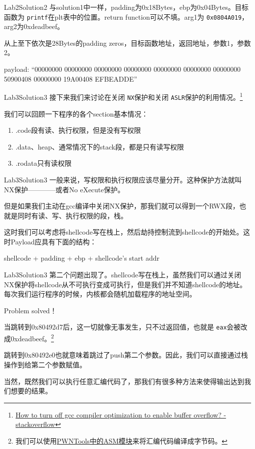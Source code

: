 \documentclass{beamer}
\begin{document}
\begin{frame}{Lab2}{Solution2}
    与solution1中一样，padding为0x18Bytes，ebp为0x04Bytes。目标函数为 \texttt{printf}在plt表中的位置。return function可以不填。arg1为 \texttt{0x0804A019}，arg2为0xdeadbeef。

    从上至下依次是28Bytes的padding zeros，目标函数地址，返回地址，参数1，参数2。

    payload: ``00000000 00000000 00000000 00000000 00000000 00000000 00000000 50900408 00000000 19A00408 EFBEADDE''
\end{frame}

\begin{frame}{Lab3}{Solution3}
    接下来我们来讨论在关闭 \texttt{NX}保护和关闭 \texttt{ASLR}保护的利用情况。\footnote{\href{https://stackoverflow.com/questions/2340259/how-to-turn-off-gcc-compiler-optimization-to-enable-buffer-overflow}{How to turn off gcc compiler optimization to enable buffer overflow? - stackoverflow}}

    我们可以回顾一下程序的各个section基本情况：

    \begin{enumerate}
        \item .code段有读、执行权限，但是没有写权限
        \item .data、heap、通常情况下的stack段，都是只有读写权限
        \item .rodata只有读权限
    \end{enumerate}
\end{frame}

\begin{frame}{Lab3}{Solution3}
    一般来说，写权限和执行权限应该尽量分开。这种保护方法就叫NX保护————或者No eXecute保护。

    但是如果我们主动在gcc编译中关闭NX保护，那我们就可以得到一个RWX段，也就是同时有读、写、执行权限的段，栈。

    这时我们可以考虑将shellcode写在栈上，然后劫持控制流到shellcode的开始处。这时Payload应具有下面的结构：

    shellcode + padding + ebp + shellcode's start addr
\end{frame}

\begin{frame}{Lab3}{Solution3}
    第二个问题出现了。shellcode写在栈上，虽然我们可以通过关闭NX保护将shellcode从不可执行变成可执行，但是我们并不知道shellcode的地址。每次我们运行程序的时候，内核都会随机加载程序的地址空间。

    Problem solved！

    当跳转到0x80492d7后，这一切就像无事发生，只不过返回值，也就是 \texttt{eax}会被改成0xdeadbeef。\footnote{我们可以使用\href{https://docs.pwntools.com/en/stable/asm.html}{PWNTools中的ASM模块}来将汇编代码编译成字节码。}

    跳转到0x80492e0也就意味着跳过了push第二个参数。因此，我们可以直接通过栈操作到给第二个参数赋值。

    当然，既然我们可以执行任意汇编代码了，那我们有很多种方法来使得输出达到我们想要的结果。
\end{frame}
\end{document}
